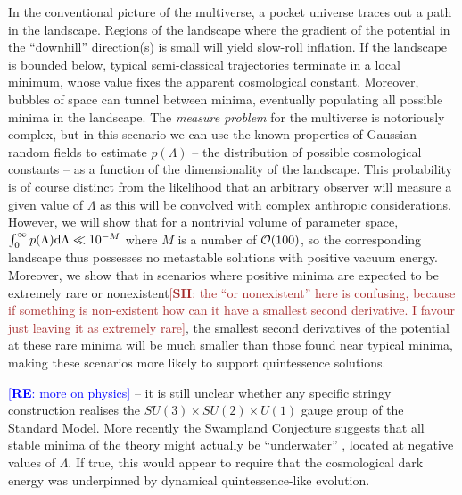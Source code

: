 \documentclass[12pt]{article}
\newcommand{\re}[1]{\textcolor{blue}{[{\bf RE}: #1]}}
\newcommand{\SH}[1]{\textcolor{brown}{[{\bf SH}: #1]}}
\begin{document}
In the conventional picture of the multiverse, a pocket universe traces out a path in the landscape. Regions of the landscape where the gradient of the potential in the ``downhill'' direction(s) is small will yield slow-roll inflation. If the landscape is bounded below, typical semi-classical trajectories terminate in a local minimum, whose value fixes the apparent cosmological constant. Moreover, bubbles of space can tunnel between minima, eventually populating all possible minima in the landscape.  The {\em measure problem\/} for the multiverse is notoriously complex, but in this scenario we can use the known properties of Gaussian random fields to estimate $p(\Lambda)$ -- the distribution of possible cosmological constants -- as a function of the dimensionality of the landscape.  This probability is of course distinct from the likelihood that an arbitrary observer will measure a given value of $\Lambda$ as this will be convolved with complex anthropic considerations. However, we will show that for a nontrivial volume of parameter space,  $\int_0^\infty  p(\Lambda) {\rm d}\Lambda \ll 10^{-M}$  where $M$ is a number of ${\cal{O}}(100)$, so the corresponding landscape thus possesses no metastable solutions with  positive vacuum energy. Moreover, we show that in scenarios where positive minima are expected to be extremely rare or nonexistent\SH{the ``or nonexistent'' here is confusing, because if something is non-existent how can it have a smallest second derivative. I favour just leaving it as extremely rare}, the smallest second derivatives of the potential at these rare minima will be much smaller than those found near typical minima, making these scenarios more likely to support quintessence solutions. 


\re{more on physics} 
 -- it is still unclear whether any specific stringy construction  realises  the $SU(3) \times SU(2) \times U(1)$ gauge group of the Standard Model.  More recently the Swampland Conjecture suggests that all stable minima of the theory might actually be ``underwater'' \cite{Agrawal2018},  located at negative values of $\Lambda$. If true, this would appear to require that the cosmological dark energy was underpinned by dynamical quintessence-like evolution.  
\end{document}
